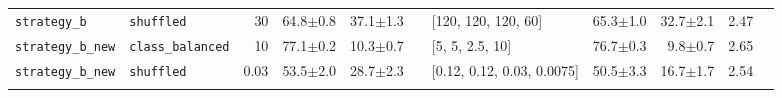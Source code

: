 \begin{tabular}{@{}llrrrrlrrrr@{}}
\texttt{strategy\_b} & \texttt{shuffled} & 30 & 64.8{\scriptsize$\pm$0.8} & 37.1{\scriptsize$\pm$1.3} & & [120, 120, 120, 60] & 65.3{\scriptsize$\pm$1.0} & 32.7{\scriptsize$\pm$2.1} & 2.47 \\
\addlinespace[2pt]
\texttt{strategy\_b\_new} & \texttt{class\_balanced} & 10 & 77.1{\scriptsize$\pm$0.2} & 10.3{\scriptsize$\pm$0.7} & & [5, 5, 2.5, 10] & 76.7{\scriptsize$\pm$0.3} & 9.8{\scriptsize$\pm$0.7} & 2.65 \\
\texttt{strategy\_b\_new} & \texttt{shuffled} & 0.03 & 53.5{\scriptsize$\pm$2.0} & 28.7{\scriptsize$\pm$2.3} & & [0.12, 0.12, 0.03, 0.0075] & 50.5{\scriptsize$\pm$3.3} & 16.7{\scriptsize$\pm$1.7} & 2.54 \\
\addlinespace[2pt]
\bottomrule
\end{tabular}
